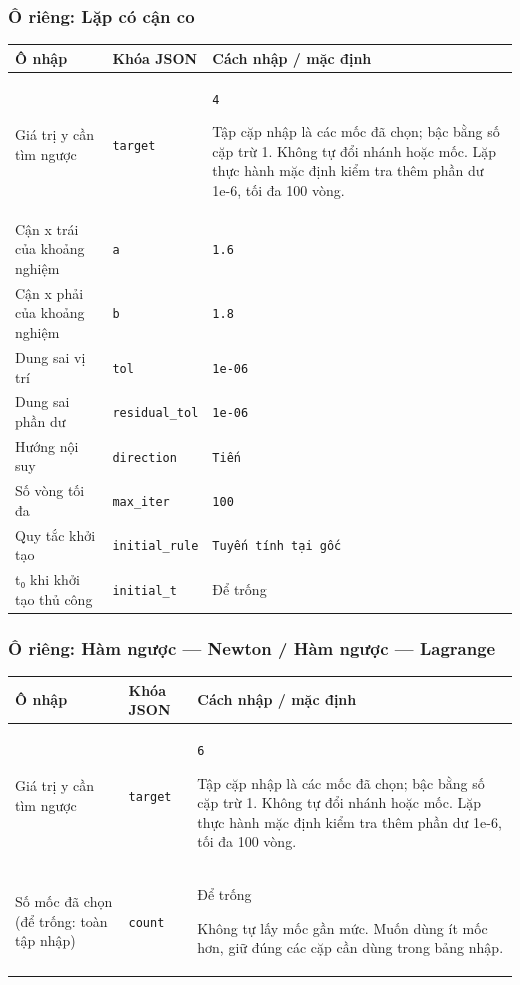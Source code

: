 \subsubsection*{Ô riêng: Lặp có cận co}
\begin{center}\small\begin{tabular}{@{}p{.32\linewidth}p{.17\linewidth}p{.43\linewidth}@{}}\toprule
Ô nhập & Khóa JSON & Cách nhập / mặc định\\\midrule
Giá trị y cần tìm ngược & \texttt{target} & \texttt{4}
\par Tập cặp nhập là các mốc đã chọn;\allowbreak{} bậc bằng số cặp trừ 1. Không tự đổi nhánh hoặc mốc. Lặp thực hành mặc định kiểm tra thêm phần dư 1e-6,\allowbreak{} tối đa 100 vòng.\\[3pt]
Cận x trái của khoảng nghiệm & \texttt{a} & \texttt{1.6}\\[3pt]
Cận x phải của khoảng nghiệm & \texttt{b} & \texttt{1.8}\\[3pt]
Dung sai vị trí & \texttt{tol} & \texttt{1e-06}\\[3pt]
Dung sai phần dư & \texttt{residual\_tol} & \texttt{1e-06}\\[3pt]
Hướng nội suy & \texttt{direction} & \texttt{Tiến}\\[3pt]
Số vòng tối đa & \texttt{max\_iter} & \texttt{100}\\[3pt]
Quy tắc khởi tạo & \texttt{initial\_rule} & \texttt{Tuyến tính tại gốc}\\[3pt]
t₀ khi khởi tạo thủ công & \texttt{initial\_t} & Để trống\\[3pt]
\bottomrule\end{tabular}\end{center}
\subsubsection*{Ô riêng: Hàm ngược — Newton /\allowbreak{} Hàm ngược — Lagrange}
\begin{center}\small\begin{tabular}{@{}p{.32\linewidth}p{.17\linewidth}p{.43\linewidth}@{}}\toprule
Ô nhập & Khóa JSON & Cách nhập / mặc định\\\midrule
Giá trị y cần tìm ngược & \texttt{target} & \texttt{6}
\par Tập cặp nhập là các mốc đã chọn;\allowbreak{} bậc bằng số cặp trừ 1. Không tự đổi nhánh hoặc mốc. Lặp thực hành mặc định kiểm tra thêm phần dư 1e-6,\allowbreak{} tối đa 100 vòng.\\[3pt]
Số mốc đã chọn (để trống: toàn tập nhập) & \texttt{count} & Để trống
\par Không tự lấy mốc gần mức. Muốn dùng ít mốc hơn,\allowbreak{} giữ đúng các cặp cần dùng trong bảng nhập.\\[3pt]
\bottomrule\end{tabular}\end{center}
